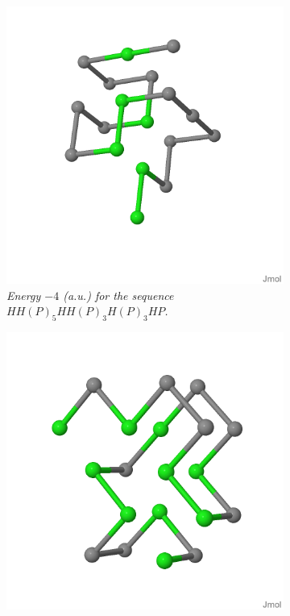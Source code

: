 \begin{figure}[H]
    \centering
    \begin{subfigure}[b]{0.45\textwidth}
        \centering
        \includegraphics[width=\textwidth]{./img/18_3D.png}
        \caption{\emph{Energy $-4$ (a.u.) for the sequence $HH(P)_5HH(P)_3H(P)_3HP$.}}
    \end{subfigure}
    \begin{subfigure}[b]{0.45\textwidth}
        \centering
        \includegraphics[width=\textwidth]{./img/20_3D.png}

\end{subfigure}
\end{figure}
